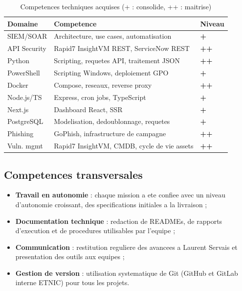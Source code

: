 \documentclass{rapport}
\begin{document}
\begin{table}[H]
\centering
\begin{tabularx}{\linewidth}{lXl}
\toprule
\textbf{Domaine} & \textbf{Competence} & \textbf{Niveau} \\
\midrule
SIEM/SOAR    & Architecture, use cases, automatisation
  & \textcolor{etnicgreen}{\textbf{+}} \\
API Security & Rapid7 InsightVM REST, ServiceNow REST
  & \textcolor{etnicgreen}{\textbf{++}} \\
Python       & Scripting, requetes API, traitement JSON
  & \textcolor{etnicgreen}{\textbf{++}} \\
PowerShell   & Scripting Windows, deploiement GPO
  & \textcolor{etnicgreen}{\textbf{+}} \\
Docker       & Compose, reseaux, reverse proxy
  & \textcolor{etnicgreen}{\textbf{++}} \\
Node.js/TS   & Express, cron jobs, TypeScript
  & \textcolor{etnicgreen}{\textbf{+}} \\
Next.js      & Dashboard React, SSR
  & \textcolor{etnicgreen}{\textbf{+}} \\
PostgreSQL   & Modelisation, dedoublonnage, requetes
  & \textcolor{etnicgreen}{\textbf{+}} \\
Phishing     & GoPhish, infrastructure de campagne
  & \textcolor{etnicgreen}{\textbf{++}} \\
Vuln. mgmt   & Rapid7 InsightVM, CMDB, cycle de vie assets
  & \textcolor{etnicgreen}{\textbf{++}} \\
\bottomrule
\end{tabularx}
\caption{Competences techniques acquises (+ : consolide, ++ : maitrise)}
\end{table}

\subsection{Competences transversales}

\begin{itemize}
  \item \textbf{Travail en autonomie} : chaque mission a ete confiee avec
        un niveau d'autonomie croissant, des specifications initiales a
        la livraison ;
  \item \textbf{Documentation technique} : redaction de READMEs, de
        rapports d'execution et de procedures utilisables par l'equipe ;
  \item \textbf{Communication} : restitution reguliere des avancees a
        Laurent Servais et presentation des outils aux equipes ;
  \item \textbf{Gestion de version} : utilisation systematique de Git
        (GitHub et GitLab interne ETNIC) pour tous les projets.
\end{itemize}
\end{document}
